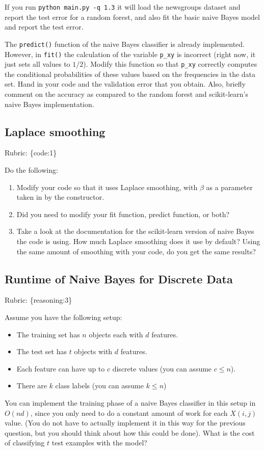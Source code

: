 \documentclass{article}
\def\blu#1{{\color{blu}#1}}
\def\gre#1{{\color{gre}#1}}
\def\items#1{\begin{itemize}#1\end{itemize}}
\def\enum#1{\begin{enumerate}#1\end{enumerate}}
\def\rubric#1{\gre{Rubric: \{#1\}}}{}
\begin{document}
If you run \texttt{python main.py -q 1.3}
it will load the newsgroups dataset and report the test error for a random forest,
and also fit the basic naive Bayes model and report the test error.

The \texttt{predict()} function of the naive Bayes classifier is already implemented.
However, in \texttt{fit()}
the calculation of the variable \texttt{p\_xy} is incorrect
(right now, it just sets all values to $1/2$).
\blu{Modify this function so that \texttt{p\_xy} correctly
computes the conditional probabilities of these values based on the
frequencies in the data set. Hand in your code and the validation error that you obtain.
Also, briefly comment on the accuracy as compared to the random forest and scikit-learn's naive Bayes implementation.}

\subsection{Laplace smoothing}
\rubric{code:1}

\blu{Do the following:}
\enum{
\item Modify your code so that it uses Laplace smoothing, with $\beta$
as a parameter taken in by the constructor.
\item Did you need to modify your fit function, predict function, or both?
\item Take a look at the documentation for the scikit-learn version of naive Bayes the code is using. How much Laplace smoothing does it use by default? Using the same amount of smoothing with your code, do you get the same results?
}


\subsection{Runtime of Naive Bayes for Discrete Data}
\rubric{reasoning:3}

Assume you have the following setup:
\items{
\item The training set has $n$ objects each with $d$ features.
\item The test set has $t$ objects with $d$ features.
\item Each feature can have up to $c$ discrete values (you can assume $c \leq n$).
\item There are $k$ class labels (you can assume $k \leq n$)
}
You can implement the training phase of a naive Bayes classifier in this setup in $O(nd)$, since you only need to do a constant amount of work for each $X(i,j)$ value. (You do not have to actually implement it in this way for the previous question, but you should think about how this could be done). \blu{What is the cost of classifying $t$ test examples with the model?}
\end{document}

